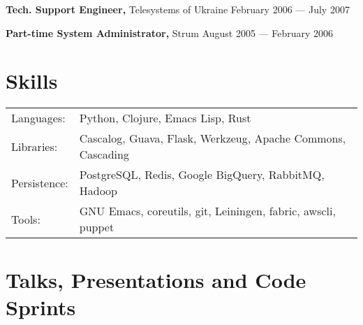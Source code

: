 \documentclass[margin]{res}
\begin{document}
\begin{resume}
{\bf Tech. Support Engineer,} Telesystems of Ukraine \hfill February 2006 --- July 2007




{\bf Part-time System Administrator,} Strum \hfill August 2005 --- February 2006



\section{Skills}
\begin{tabular}{l p{3in}}
  Languages: & Python, Clojure, Emacs Lisp, Rust \\
  Libraries: & Cascalog, Guava, Flask, Werkzeug, Apache Commons, Cascading \\
  Persistence: & PostgreSQL, Redis, Google BigQuery, RabbitMQ, Hadoop \\
  Tools: & GNU Emacs, coreutils, git, Leiningen, fabric, awscli, puppet \\
\end{tabular}

\section{Talks, Presentations and Code Sprints}


\end{resume}
\end{document}
